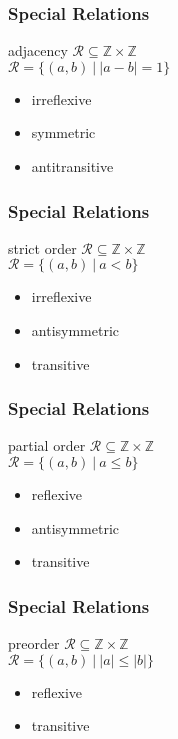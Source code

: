 \documentclass[dvipsnames]{beamer}
\begin{document}
\begin{frame}
  \frametitle{Special Relations}

  \begin{block}{adjacency}
    $\mathcal{R} \subseteq \mathbb{Z} \times \mathbb{Z}$\\
    $\mathcal{R} = \{(a,b)~|~|a-b|=1\}$
  \end{block}

  \medskip
  \begin{itemize}
    \item irreflexive
    \item symmetric
    \item antitransitive
  \end{itemize}
\end{frame}

\begin{frame}
  \frametitle{Special Relations}

  \begin{block}{strict order}
    $\mathcal{R} \subseteq \mathbb{Z} \times \mathbb{Z}$\\
    $\mathcal{R} = \{(a,b)~|~a<b\}$
  \end{block}

  \medskip
  \begin{itemize}
    \item irreflexive
    \item antisymmetric
    \item transitive
  \end{itemize}
\end{frame}

\begin{frame}
  \frametitle{Special Relations}

  \begin{block}{partial order}
    $\mathcal{R} \subseteq \mathbb{Z} \times \mathbb{Z}$\\
    $\mathcal{R} = \{(a,b)~|~ a \leq b\}$
  \end{block}

  \medskip
  \begin{itemize}
    \item reflexive
    \item antisymmetric
    \item transitive
  \end{itemize}
\end{frame}

\begin{frame}
  \frametitle{Special Relations}

  \begin{block}{preorder}
    $\mathcal{R} \subseteq \mathbb{Z} \times \mathbb{Z}$\\
    $\mathcal{R} = \{(a,b)~|~|a| \leq |b|\}$
  \end{block}

  \medskip
  \begin{itemize}
    \item reflexive
    \item transitive
  \end{itemize}
\end{frame}
\end{document}
